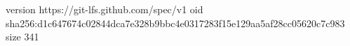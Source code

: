 version https://git-lfs.github.com/spec/v1
oid sha256:d1c647674c02844dca7e328b9bbc4e0317283f15e129aa5af28cc05620c7c983
size 341
